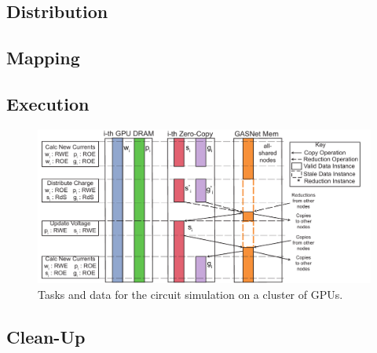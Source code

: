 \subsection{Distribution}
\label{sec:dist}

\subsection{Mapping}
\label{sec:map}




\subsection{Execution}
\label{sec:exec}

\begin{figure}
\includegraphics[scale=0.48]{figs/CircuitMem.pdf}
\caption{Tasks and data for the circuit simulation on a cluster of GPUs.}
\end{figure}

\subsection{Clean-Up}
\label{sec:clean}

